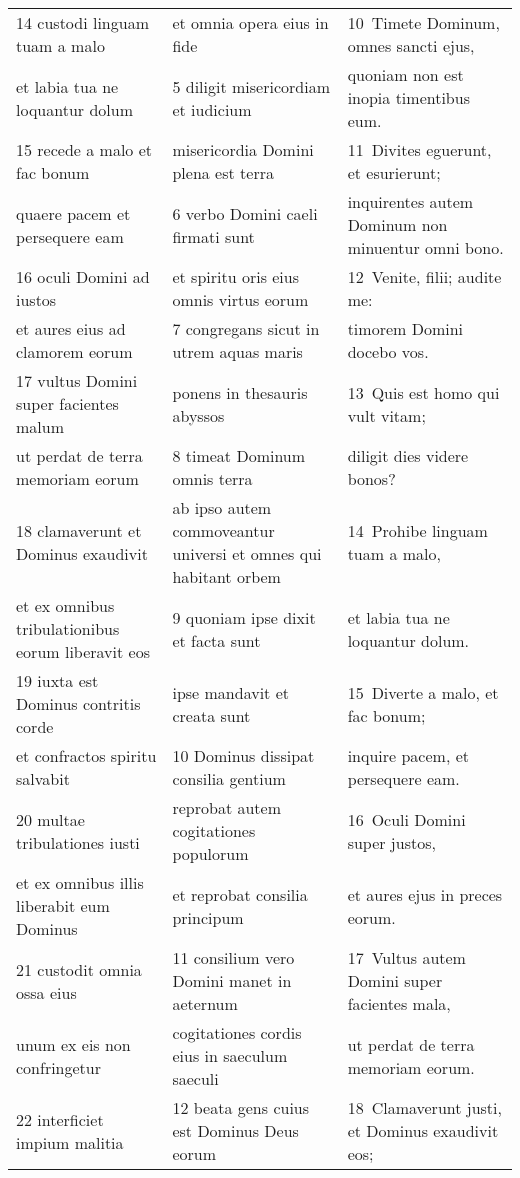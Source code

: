 \documentclass{article}
\begin{document}
\begin{longtable}{@{}p{}p{}p{}@{}}
14 custodi linguam tuam a malo	&	et omnia opera eius in fide	&	10 Timete Dominum, omnes sancti ejus,	\\
et labia tua ne loquantur dolum	&	5 diligit misericordiam et iudicium	&	quoniam non est inopia timentibus eum.	\\
15 recede a malo et fac bonum	&	misericordia Domini plena est terra	&	11 Divites eguerunt, et esurierunt;	\\
quaere pacem et persequere eam	&	6 verbo Domini caeli firmati sunt	&	inquirentes autem Dominum non minuentur omni bono.	\\
16 oculi Domini ad iustos	&	et spiritu oris eius omnis virtus eorum	&	12 Venite, filii; audite me:	\\
et aures eius ad clamorem eorum	&	7 congregans sicut in utrem aquas maris	&	timorem Domini docebo vos.	\\
17 vultus Domini super facientes malum	&	ponens in thesauris abyssos	&	13 Quis est homo qui vult vitam;	\\
ut perdat de terra memoriam eorum	&	8 timeat Dominum omnis terra	&	diligit dies videre bonos?	\\
18 clamaverunt et Dominus exaudivit	&	ab ipso autem commoveantur universi et omnes qui habitant orbem	&	14 Prohibe linguam tuam a malo,	\\
et ex omnibus tribulationibus eorum liberavit eos	&	9 quoniam ipse dixit et facta sunt	&	et labia tua ne loquantur dolum.	\\
19 iuxta est Dominus contritis corde	&	ipse mandavit et creata sunt	&	15 Diverte a malo, et fac bonum;	\\
et confractos spiritu salvabit	&	10 Dominus dissipat consilia gentium	&	inquire pacem, et persequere eam.	\\
20 multae tribulationes iusti	&	reprobat autem cogitationes populorum	&	16 Oculi Domini super justos,	\\
et ex omnibus illis liberabit eum Dominus	&	et reprobat consilia principum	&	et aures ejus in preces eorum.	\\
21 custodit omnia ossa eius	&	11 consilium vero Domini manet in aeternum	&	17 Vultus autem Domini super facientes mala,	\\
unum ex eis non confringetur	&	cogitationes cordis eius in saeculum saeculi	&	ut perdat de terra memoriam eorum.	\\
22 interficiet impium malitia	&	12 beata gens cuius est Dominus Deus eorum	&	18 Clamaverunt justi, et Dominus exaudivit eos;	\\

\end{longtable}
\end{document}

